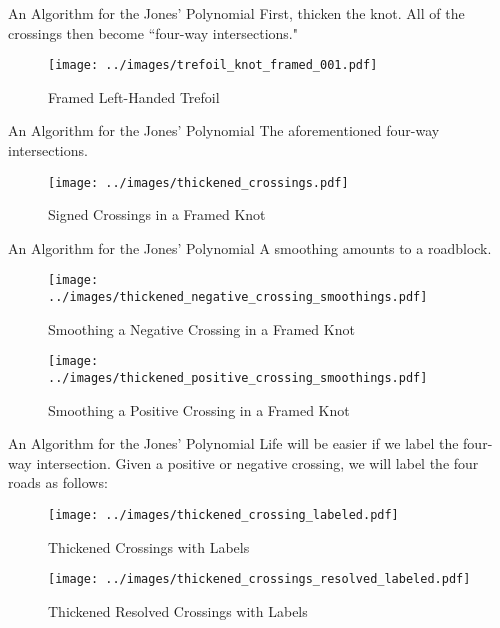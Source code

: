 \documentclass{beamer}
\begin{document}
    \begin{frame}{An Algorithm for the Jones' Polynomial}
        First, thicken the knot. All of the crossings then become
        ``four-way intersections."
        \begin{figure}
            \centering
            \texttt{[image: ../images/trefoil\_knot\_framed\_001.pdf]}
            \caption{Framed Left-Handed Trefoil}
            \label{fig:trefoil_knot_framed_001}
        \end{figure}
    \end{frame}
    \begin{frame}{An Algorithm for the Jones' Polynomial}
        The aforementioned four-way intersections.
        \begin{figure}
            \centering
            \texttt{[image: ../images/thickened\_crossings.pdf]}
            \caption{Signed Crossings in a Framed Knot}
            \label{fig:thickened_crossings}
        \end{figure}
    \end{frame}
    \begin{frame}{An Algorithm for the Jones' Polynomial}
        A smoothing amounts to a roadblock.
        \begin{figure}
            \centering
            \texttt{[image: ../images/thickened\_negative\_crossing\_smoothings.pdf]}
            \caption{Smoothing a Negative Crossing in a Framed Knot}
            \label{fig:thickened_negative_crossing_smoothings}
        \end{figure}
        \begin{figure}
            \centering
            \texttt{[image: ../images/thickened\_positive\_crossing\_smoothings.pdf]}
            \caption{Smoothing a Positive Crossing in a Framed Knot}
            \label{fig:thickened_positive_crossing_smoothings}
        \end{figure}
    \end{frame}
    \begin{frame}{An Algorithm for the Jones' Polynomial}
        Life will be easier if we label the four-way intersection. Given a
        positive or negative crossing, we will label the four roads as follows:
        \begin{figure}
            \centering
            \texttt{[image: ../images/thickened\_crossing\_labeled.pdf]}
            \caption{Thickened Crossings with Labels}
            \label{fig:thickened_crossings_labeled}
        \end{figure}
        \begin{figure}
            \centering
            \texttt{[image: ../images/thickened\_crossings\_resolved\_labeled.pdf]}
            \caption{Thickened Resolved Crossings with Labels}
            \label{fig:thickened_crossings_resolved_labeled}
        \end{figure}
    \end{frame}
\end{document}
